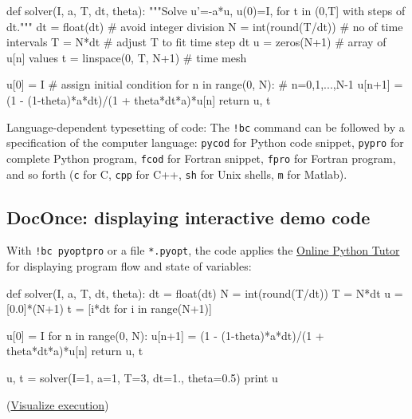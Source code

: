 \documentclass[%
oneside,                 %
final,                   %
10pt]{article}
\begin{document}
\bpycod
def solver(I, a, T, dt, theta):
    """Solve u'=-a*u, u(0)=I, for t in (0,T] with steps of dt."""
    dt = float(dt)           # avoid integer division
    N = int(round(T/dt))     # no of time intervals
    T = N*dt                 # adjust T to fit time step dt
    u = zeros(N+1)           # array of u[n] values
    t = linspace(0, T, N+1)  # time mesh

    u[0] = I                 # assign initial condition
    for n in range(0, N):    # n=0,1,...,N-1
        u[n+1] = (1 - (1-theta)*a*dt)/(1 + theta*dt*a)*u[n]
    return u, t

\epycod


\begin{block}{Language-dependent typesetting of code: }
The \Verb?!bc? command can be followed by a specification of the computer
language: \texttt{pycod} for Python code snippet, \texttt{pypro} for complete Python
program, \texttt{fcod} for Fortran snippet, \texttt{fpro} for Fortran program, and so
forth (\texttt{c} for C, \texttt{cpp} for C++, \texttt{sh} for Unix shells, \texttt{m} for Matlab).
\end{block}

\subsection{DocOnce: displaying interactive demo code}
\label{slide:pot}

With \Verb?!bc pyoptpro? or a file \texttt{*.pyopt}, the code applies the
\href{{https://pythontutor.com}}{Online Python Tutor} for displaying
program flow and state of variables:
















\bpypro
def solver(I, a, T, dt, theta):
    dt = float(dt)
    N = int(round(T/dt))
    T = N*dt
    u = [0.0]*(N+1)
    t = [i*dt for i in range(N+1)]

    u[0] = I
    for n in range(0, N):
        u[n+1] = (1 - (1-theta)*a*dt)/(1 + theta*dt*a)*u[n]
    return u, t

u, t = solver(I=1, a=1, T=3, dt=1., theta=0.5)
print u

\epypro

\noindent
(\href{{https://pythontutor.com/visualize.html\#code=def+solver\%28I\%2C+a\%2C+T\%2C+dt\%2C+theta\%29\%3A\%0A++++dt+\%3D+float\%28dt\%29\%0A++++N+\%3D+int\%28round\%28T\%2Fdt\%29\%29\%0A++++T+\%3D+N\%2Adt\%0A++++u+\%3D+\%5B0.0\%5D\%2A\%28N\%2B1\%29\%0A++++t+\%3D+\%5Bi\%2Adt+for+i+in+range\%28N\%2B1\%29\%5D\%0A\%0A++++u\%5B0\%5D+\%3D+I\%0A++++for+n+in+range\%280\%2C+N\%29\%3A\%0A++++++++u\%5Bn\%2B1\%5D+\%3D+\%281+-+\%281-theta\%29\%2Aa\%2Adt\%29\%2F\%281+\%2B+theta\%2Adt\%2Aa\%29\%2Au\%5Bn\%5D\%0A++++return+u\%2C+t\%0A\%0Au\%2C+t+\%3D+solver\%28I\%3D1\%2C+a\%3D1\%2C+T\%3D3\%2C+dt\%3D1.\%2C+theta\%3D0.5\%29\%0Aprint+u&mode=display&cumulative=false&heapPrimitives=false&drawParentPointers=false&textReferences=false&py=2&curInstr=0}}{Visualize execution}) 
\end{document}
